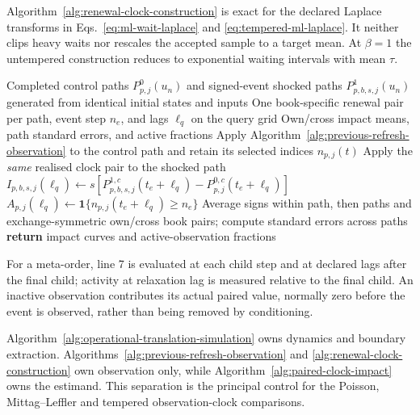 Algorithm~\ref{alg:renewal-clock-construction} is exact for the declared
Laplace transforms in Eqs.~\eqref{eq:ml-wait-laplace} and
\eqref{eq:tempered-ml-laplace}.  It neither clips heavy waits nor rescales the
accepted sample to a target mean.  At $\beta=1$ the untempered construction
reduces to exponential waiting intervals with mean $\tau$.

\begin{algorithm}[H]
\caption{Common-input paired impact under an observation clock}
\label{alg:paired-clock-impact}
\begin{algorithmic}[1]
\Require Completed control paths $P_{p,j}^{0}(u_n)$ and signed-event shocked
paths $P_{p,b,s,j}^{1}(u_n)$ generated from identical initial states and inputs
\Require One book-specific renewal pair per path, event step $n_e$, and lags
$\ell_q$ on the query grid
\Ensure Own/cross impact means, path standard errors, and active fractions
  \State Apply Algorithm~\ref{alg:previous-refresh-observation} to the control
  path and retain its selected indices $n_{p,j}(t)$
    \State Apply the \emph{same} realised clock pair to the shocked path
      \State $I_{p,b,s,j}(\ell_q)\gets s[P_{p,b,s,j}^{1,c}(t_e+\ell_q)
      -P_{p,j}^{0,c}(t_e+\ell_q)]$
      \State $A_{p,j}(\ell_q)\gets
      \mathbf 1\{n_{p,j}(t_e+\ell_q)\geq n_e\}$
    \EndFor
  \EndFor
\EndFor
\State Average signs within path, then paths and exchange-symmetric own/cross
book pairs; compute standard errors across paths
\State \textbf{return} impact curves and active-observation fractions
\end{algorithmic}
\end{algorithm}

For a meta-order, line 7 is evaluated at each child step and at declared lags
after the final child; activity at relaxation lag is measured relative to the
final child.  An inactive observation contributes its actual paired value,
normally zero before the event is observed, rather than being removed by
conditioning.

Algorithm~\ref{alg:operational-translation-simulation} owns dynamics and
boundary extraction.  Algorithms~\ref{alg:previous-refresh-observation} and
\ref{alg:renewal-clock-construction} own observation only, while
Algorithm~\ref{alg:paired-clock-impact} owns the estimand.  This separation is
the principal control for the Poisson, Mittag--Leffler and tempered
observation-clock comparisons.
